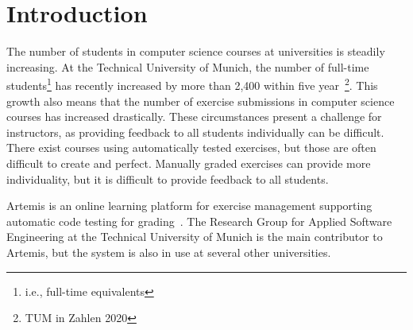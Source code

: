 
\def\proposal{Proposal for}

\usepackage[nolist]{acronym}
\usepackage{csquotes}


\setlength{\evensidemargin}{22pt}
\setlength{\oddsidemargin}{22pt}



\lstset{showspaces=false, numbers=left, frame=single, basicstyle=\small}




\fancyhead{}
\pagestyle{fancy}
\fancyhead[LE]{\slshape \leftmark}
\fancyhead[RO]{\slshape \rightmark}
\headheight=15pt


\section*{Introduction}

The number of students in computer science courses at universities is steadily increasing. At the Technical University of Munich, the number of full-time students\footnote{i.e., full-time equivalents} has recently increased by more than 2,400 within five year~\footnote{TUM in Zahlen 2020}. This growth also means that the number of exercise submissions in computer science courses has increased drastically.
These circumstances present a challenge for instructors, as providing feedback to all students individually can be difficult. There exist courses using automatically tested exercises, but those are often difficult to create and perfect. Manually graded exercises can provide more individuality, but it is difficult to provide feedback to all students.

Artemis is an online learning platform for exercise management supporting automatic code testing for grading~\cite{ArTEMiS}. The Research Group for Applied Software Engineering at the Technical University of Munich is the main contributor to Artemis, but the system is also in use at several other universities.

